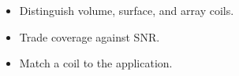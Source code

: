 \begin{objectives}
\begin{itemize}[leftmargin=1.4em,itemsep=2pt]
\item Distinguish volume, surface, and array coils.
\item Trade coverage against SNR.
\item Match a coil to the application.
\end{itemize}
\end{objectives}
